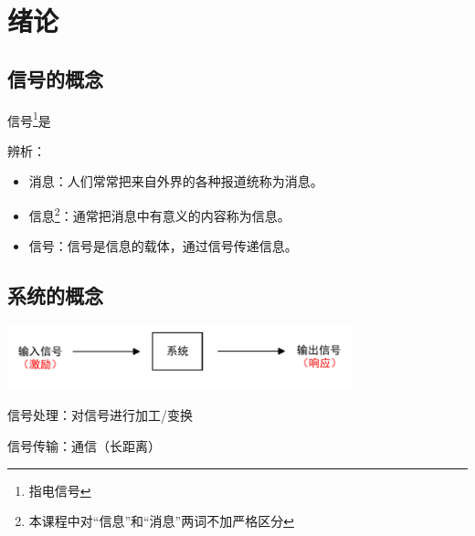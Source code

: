 \section{绪论}

\subsection{信号的概念}
信号\footnote{指电信号}是

辨析：
\begin{itemize}
    \item 消息：人们常常把来自外界的各种报道统称为消息。
    \item 信息\footnote{本课程中对“信息”和“消息”两词不加严格区分}：通常把消息中有意义的内容称为信息。
    \item 信号：信号是信息的载体，通过信号传递信息。
\end{itemize}

\subsection{系统的概念}

\begin{Figure}[系统组成]
    \includegraphics[width=100mm]{visio/1.1.pdf}
\end{Figure}

信号处理：对信号进行加工/变换

信号传输：通信（长距离）



